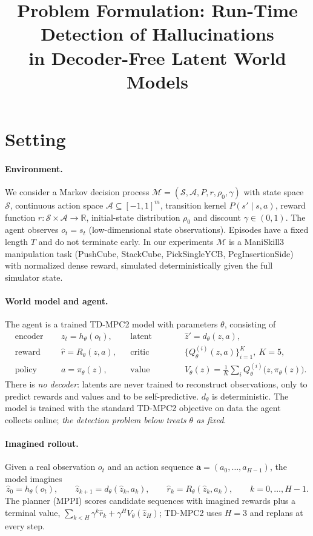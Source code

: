 \documentclass[11pt]{article}
\title{Problem Formulation: Run-Time Detection of Hallucinations\\in Decoder-Free Latent World Models}
\author{}
\date{}
\newcommand{\R}{\mathbb{R}}
\begin{document}
\maketitle

\section{Setting}

\paragraph{Environment.}
We consider a Markov decision process $\mathcal{M}=(\mathcal{S},\mathcal{A},P,r,\rho_0,\gamma)$ with state space
$\mathcal{S}$, continuous action space $\mathcal{A}\subseteq[-1,1]^{m}$, transition kernel $P(s'\mid s,a)$, reward
function $r:\mathcal{S}\times\mathcal{A}\to\R$, initial-state distribution $\rho_0$ and discount $\gamma\in(0,1)$.
The agent observes $o_t=s_t$ (low-dimensional state observations). Episodes have a fixed length $T$ and do not
terminate early. In our experiments $\mathcal{M}$ is a ManiSkill3 manipulation task (PushCube, StackCube,
PickSingleYCB, PegInsertionSide) with normalized dense reward, simulated deterministically given the full simulator
state.

\paragraph{World model and agent.}
The agent is a trained TD-MPC2 model with parameters $\theta$, consisting of
\begin{align*}
&\text{encoder} && z_t = h_\theta(o_t), &
&\text{latent dynamics} && \hat z' = d_\theta(z,a),\\
&\text{reward head} && \hat r = R_\theta(z,a), &
&\text{critic ensemble} && \{Q_\theta^{(i)}(z,a)\}_{i=1}^{K},\ K=5,\\
&\text{policy prior} && a=\pi_\theta(z), &
&\text{value} && V_\theta(z)=\tfrac1K\textstyle\sum_i Q^{(i)}_\theta\big(z,\pi_\theta(z)\big).
\end{align*}
There is \emph{no decoder}: latents are never trained to reconstruct observations, only to predict rewards and values
and to be self-predictive. $d_\theta$ is deterministic. The model is trained with the standard TD-MPC2 objective
on data the agent collects online; \emph{the detection problem below treats $\theta$ as fixed}.

\paragraph{Imagined rollout.}
Given a real observation $o_t$ and an action sequence $\mathbf a=(a_0,\dots,a_{H-1})$, the model imagines
\[
\hat z_0=h_\theta(o_t),\qquad \hat z_{k+1}=d_\theta(\hat z_k,a_k),\qquad \hat r_k=R_\theta(\hat z_k,a_k),\qquad k=0,\dots,H-1.
\]
The planner (MPPI) scores candidate sequences with imagined rewards plus a terminal value,
$\sum_{k<H}\gamma^k\hat r_k+\gamma^H V_\theta(\hat z_H)$; TD-MPC2 uses $H=3$ and replans at every step.
\end{document}
